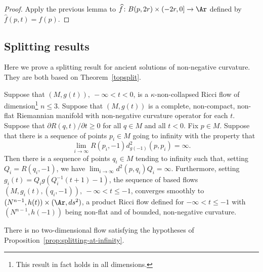 \begin{proof}
Apply the previous lemma to $\widehat f\colon B(p,2r)\times
(-2r,0]\to \Ar$ defined by $\widehat f(p,t)=f(p)$.
\end{proof}


\subsection{Splitting results}

Here we prove a splitting result for ancient solutions
of non-negative curvature. They are both based on Theorem~\ref{topsplit}.



\begin{proposition}\label{prop:splitting-at-infinity}
\label{prodatinf}
Suppose that $(M,g(t)),\ -\infty <t< 0$, is a $\kappa$-non-collapsed
 Ricci flow of dimension\footnote{This result in fact
 holds in all dimensions.} $n\le 3$. Suppose that $(M,g(t))$ is a
 complete, non-compact, non-flat Riemannian manifold
with non-negative curvature operator for each $t$. Suppose  that
$\partial R(q,t)/\partial t\ge 0$ for all $q\in M$ and all $t<0$.
Fix $p\in M$. Suppose that there is a sequence of points $p_i\in M$
going to infinity with the property that
$$\lim_{i\rightarrow \infty}R(p_i,-1)d^2_{g(-1)}(p,p_i)=\infty.$$
  Then
there is a sequence of points $q_i\in M$ tending to infinity such
that, setting $Q_i=R(q_i,-1)$, we have $\lim_{i\rightarrow\infty}d^2(p,q_i)Q_i=\infty$. Furthermore, setting
$g_i(t)=Q_ig(Q_i^{-1}(t+1)-1)$,
 the
sequence of  based flows $(M,g_i(t),(q_i,-1)),\ -\infty<t\le -1$,
converges smoothly to $(N^{n-1},h(t))\times (\Ar,ds^2)$, a product
Ricci flow defined for $-\infty<t\le -1$ with $(N^{n-1},h(-1))$
being non-flat and of bounded, non-negative curvature.
\end{proposition}


\begin{corollary}\label{cor:no-two-dimensional-splitting-example}
\label{compact2D}
There is no two-dimensional flow satisfying the hypotheses of
Proposition~\ref{prop:splitting-at-infinity}.
\end{corollary}

